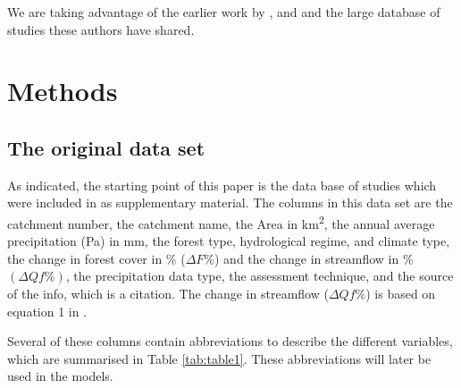 \documentclass[]{elsarticle} %
\begin{document}
We are taking advantage of the earlier work by \citet{zhang2017}, \citet{filoso2017} and \citet{zhou2015} and the large database of studies these authors have shared.

\hypertarget{methods}{%
\section{Methods}\label{methods}}

\hypertarget{the-original-data-set}{%
\subsection{The original data set}\label{the-original-data-set}}

As indicated, the starting point of this paper is the data base of studies which were included in \citet{zhang2017} as supplementary material. The columns in this data set are the catchment number, the catchment name, the Area in km\textsuperscript{2}, the annual average precipitation (Pa) in mm, the forest type, hydrological regime, and climate type, the change in forest cover in \% (\(\Delta F\%\)) and the change in streamflow in \% \((\Delta Qf\%)\), the precipitation data type, the assessment technique, and the source of the info, which is a citation. The change in streamflow (\(\Delta Qf\%\)) is based on equation 1 in \citet{zhang2017}.

Several of these columns contain abbreviations to describe the different variables, which are summarised in Table \ref{tab:table1}. These abbreviations will later be used in the models.
\end{document}
